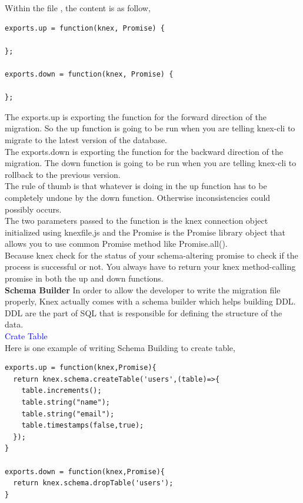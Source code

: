 \documentclass[a4paper]{article}
\begin{document}
Within the file , the content is as follow,
\begin{lstlisting}
exports.up = function(knex, Promise) {
  
};

exports.down = function(knex, Promise) {
  
};
\end{lstlisting}
The exports.up is exporting the function for the forward direction of the migration. So the up function is going to be run when you are telling knex-cli to migrate to the latest version of the database.\\

The exports.down is exporting the function for the backward direction of the migration. The down function is going to be run when you are telling knex-cli to rollback to the previous version.\\

The rule of thumb is that whatever is doing in the up function has to be completely undone by the down function. Otherwise inconsistencies could possibly occurs.\\

The two parameters passed to the function is the knex connection object initialized using knexfile.js and the Promise is the Promise library object that allows you to use common Promise method like Promise.all().\\

Because knex check for the status of your schema-altering promise to check if the process is successful or not. You always have to return your knex method-calling promise in both the up and down functions.
\\

\textbf{Schema Builder}
In order to allow the developer to write the migration file properly, Knex actually comes with a schema builder which helps building DDL. DDL are the part of SQL that is responsible for defining the structure of the data.\\

\textcolor{blue}{Crate Table}\\

Here is one example of writing Schema Building to create table,
\begin{lstlisting}
exports.up = function(knex,Promise){
  return knex.schema.createTable('users',(table)=>{
    table.increments();
    table.string("name");
    table.string("email");
    table.timestamps(false,true);
  });
}

exports.down = function(knex,Promise){
  return knex.schema.dropTable('users');
}
\end{lstlisting}
\end{document}
